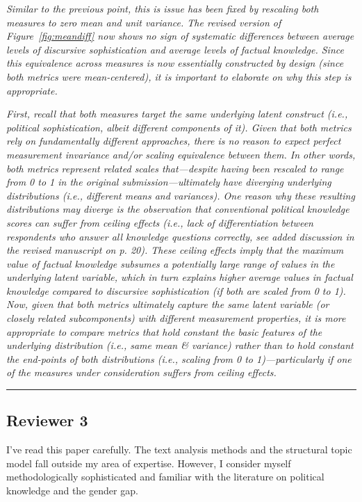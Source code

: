 \textit{Similar to the previous point, this is issue has been fixed by rescaling both measures to zero mean and unit variance. The revised version of Figure~\ref{fig:meandiff} now shows no sign of systematic differences between average levels of discursive sophistication and average levels of factual knowledge. Since this equivalence across measures is now essentially constructed by design (since both metrics were mean-centered), it is important to elaborate on why this step is appropriate.}

\textit{First, recall that both measures target the same underlying latent construct (i.e., political sophistication, albeit different components of it). Given that both metrics rely on fundamentally different approaches, there is no reason to expect perfect measurement invariance and/or scaling equivalence between them. In other words, both metrics represent related scales that---despite having been rescaled to range from 0 to 1 in the original submission---ultimately have diverging underlying distributions (i.e., different means and variances). One reason why these resulting distributions may diverge is the observation that conventional political knowledge scores can suffer from ceiling effects (i.e., lack of differentiation between respondents who answer all knowledge questions correctly, see added discussion in the revised manuscript on p. 20). These ceiling effects imply that the maximum value of factual knowledge subsumes a potentially large range of values in the underlying latent variable, which in turn explains higher average values in factual knowledge compared to discursive sophistication (if both are scaled from 0 to 1). Now, given that both metrics ultimately capture the same latent variable (or closely related subcomponents) with different measurement properties, it is more appropriate to compare metrics that hold constant the basic features of the underlying distribution (i.e., same mean \& variance) rather than to hold constant the end-points of both distributions (i.e., scaling from 0 to 1)---particularly if one of the measures under consideration suffers from ceiling effects.}


\rule{\linewidth}{.01cm}


\subsection*{Reviewer 3}

I've read this paper carefully. The text analysis methods and the structural topic model fall outside my area of expertise. However, I consider myself methodologically sophisticated and familiar with the literature on political knowledge and the gender gap.

